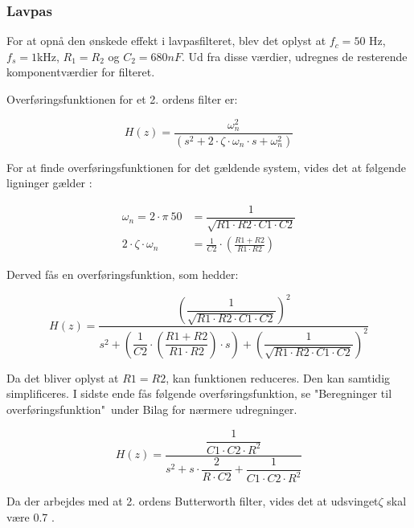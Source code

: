 \subsubsection{Lavpas}
For at opnå den ønskede effekt i lavpasfilteret, blev det oplyst at $ f_c=50$ Hz, $ f_s = 1$kHz, $ R_1 = R_2 $ og $ C_2=680 nF$. Ud fra disse værdier, udregnes de resterende komponentværdier for filteret.

Overføringsfunktionen for et 2. ordens filter er:
\begin{ceqn}
\begin{equation}
H(z)=\frac{\omega_n^2}{(s^2 + 2\cdot\zeta \cdot \omega_n \cdot s+\omega_n^2)}
\end{equation}
\end{ceqn}

For at finde overføringsfunktionen for det gældende system, vides det at følgende ligninger gælder \cite{Wikilavpas}:
\begin{ceqn} 
\begin{equation}
\begin{split}
\omega_n = 2\cdot \pi\ 50 &= \dfrac{1}{\sqrt{R1\cdot R2\cdot C1\cdot C2}}\\
2\cdot \zeta\cdot\omega_n& =\frac{1}{C2}\cdot \left( \frac{R1+R2}{R1\cdot R2}\right)
\end{split}
\end{equation}
\end{ceqn}
Derved fås en overføringsfunktion, som hedder: 
\begin{ceqn}
\begin{equation}
H(z)=\frac{\left(\dfrac{1}{\sqrt{R1\cdot R2 \cdot C1\cdot C2}}\right)^2}{s^2+ \left( \dfrac{1}{C2} \cdot \left( \dfrac{R1+R2}{R1\cdot R2}\right) \cdot s \right) +\left( \dfrac{1}{\sqrt{R1\cdot R2 \cdot C1\cdot C2}}\right)^2 }
\end{equation}
\end{ceqn}
Da det bliver oplyst at $ R1=R2 $, kan funktionen reduceres. Den kan samtidig simplificeres. I sidste ende fås følgende overføringsfunktion, se "Beregninger til overføringsfunktion"\ under Bilag for nærmere udregninger.
\begin{ceqn}
\begin{equation}
H(z)=\dfrac{\dfrac{1}{C1 \cdot C2\cdot R^2}}{s^2+s\cdot \dfrac{2}{R\cdot C2}+ \dfrac{1}{C1\cdot C2\cdot R^2}}
\end{equation}
\end{ceqn}
Da der arbejdes med at 2. ordens Butterworth filter, vides det at udsvinget$ \zeta $ skal være 0.7 \cite{ASB}. 
